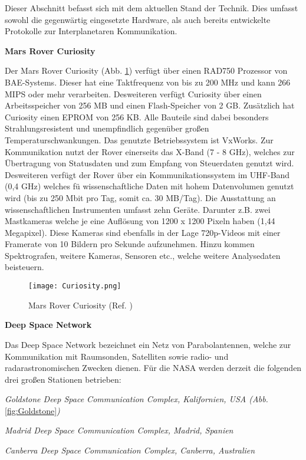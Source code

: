 \label{cap:standDerTechnik}
Dieser Abschnitt befasst sich mit dem aktuellen Stand der Technik. Dies umfasst
sowohl die gegenw{\"a}rtig eingesetzte Hardware, als auch bereits
entwickelte Protokolle zur Interplanetaren Kommunikation.


\textbf{Mars Rover Curiosity}

Der Mars Rover Curiosity (Abb. \ref{fig:Curiosity}) verf{\"u}gt {\"u}ber einen
RAD750 Prozessor von BAE-Systems.
Dieser hat eine Taktfrequenz von bis zu 200 MHz und kann 266 MIPS oder mehr
verarbeiten. Desweiteren verf{\"u}gt Curiosity {\"u}ber einen Arbeitsspeicher von 256 MB
und einen Flash-Speicher von 2 GB. Zus{\"a}tzlich hat Curiosity einen EPROM von 256
KB. Alle Bauteile sind dabei besonders Strahlungsresistent und unempfindlich
gegen{\"u}ber gro{\ss}en Temperaturschwankungen. Das genutzte Betriebssystem ist
VxWorks. Zur Kommunikation nutzt der Rover
einerseits das X-Band (7 - 8 GHz), welches zur {\"U}bertragung von Statusdaten
und zum Empfang von Steuerdaten genutzt wird. Desweiteren verf{\"u}gt der Rover
{\"u}ber ein Kommunikationssystem im UHF-Band (0,4 GHz) welches f{\"u}
wissenschaftliche Daten mit hohem Datenvolumen genutzt wird (bis zu 250 Mbit
pro Tag, somit ca. 30 MB/Tag). Die Ausstattung an wissenschaftlichen
Instrumenten umfasst zehn Ger{\"a}te. Darunter z.B. zwei Mastkameras welche je
eine Aufl{\"o}sung von 1200 x 1200 Pixeln haben (1,44 Megapixel). Diese Kameras
sind ebenfalls in der Lage 720p-Videos mit einer Framerate von 10 Bildern pro
Sekunde aufzunehmen. Hinzu kommen Spektrografen, weitere Kameras, Sensoren etc.,
welche weitere Analysedaten beisteuern.

\begin{figure}[H]
\centering
\texttt{[image: Curiosity.png]}
\caption{Mars Rover Curiosity (Ref. \cite{imgCuriosity})}
\label{fig:Curiosity}
\end{figure}

\textbf{Deep Space Network}

Das Deep Space Network bezeichnet ein Netz von Parabolantennen, welche zur
Kommunikation mit Raumsonden, Satelliten sowie radio-
und radarastronomischen Zwecken dienen. F{\"u}r die NASA werden derzeit die
folgenden drei gro{\ss}en Stationen betrieben:

\begin{compactenum}[a)]
\item \textit{Goldstone Deep Space Communication Complex, Kalifornien, USA
(Abb.} \ref{fig:Goldstone}\textit{)}
\item \textit{Madrid Deep Space Communication Complex, Madrid, Spanien}
\item \textit{Canberra Deep Space Communication Complex, Canberra, Australien}
\end{compactenum}

